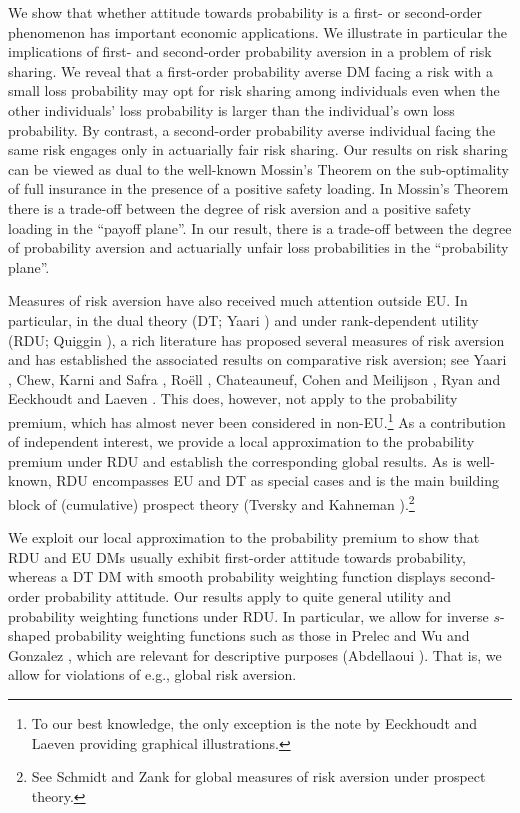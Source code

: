 \documentclass[11pt]{article}
\begin{document}
We show that whether attitude towards probability is a first- or second-order phenomenon has 
important economic applications.
We illustrate in particular the 
implications of first- and second-order probability aversion
in a problem of risk sharing.
We reveal that a first-order probability averse DM facing a risk with a small loss probability may opt for 
risk sharing among individuals
even when the other individuals' loss probability is 
larger than the individual's own loss probability.
By contrast, a second-order probability averse individual facing the same risk engages only in actuarially fair 
risk sharing.
Our results on risk sharing can be viewed as dual to the well-known Mossin's \cite{M68} Theorem
on the sub-optimality of full insurance in the presence of a positive safety loading.
In Mossin's Theorem there is a trade-off between the degree of risk aversion
and a positive safety loading in the ``payoff plane''.
In our result, there is a trade-off between the degree of probability aversion
and actuarially unfair loss probabilities
in the ``probability plane''.

Measures of risk aversion have also received much attention outside EU.
In particular, in the dual theory (DT; Yaari \cite{Y87}) and under rank-dependent utility (RDU; Quiggin \cite{Q82}),
a rich literature
has proposed several measures of risk aversion
and has established the associated results on comparative risk aversion;
see Yaari \cite{Y86,Y87}, Chew, Karni and Safra \cite{CKS87}, Ro\"ell \cite{R87}, Chateauneuf, Cohen and Meilijson \cite{CCM04}, Ryan \cite{R06} and Eeckhoudt and Laeven \cite{EL20}.
This does, however, not apply to the probability premium,
which has almost never been considered in non-EU.\footnote{To our best knowledge, the only exception is the note by Eeckhoudt and Laeven \cite{EL15} providing graphical illustrations.}
As a contribution of independent interest, we provide a local approximation to the probability premium under RDU
and establish the corresponding global results.
As is well-known,
RDU encompasses EU and DT as special cases
and is the main building block of (cumulative) prospect theory (Tversky and Kahneman \cite{TK92}).\footnote{See Schmidt and Zank \cite{SZ08} for global measures of risk aversion
under prospect theory.
}

We exploit our local approximation to the probability premium to show that
RDU and EU DMs usually exhibit first-order attitude towards probability, 
whereas a DT DM with smooth probability weighting function displays second-order probability attitude.
Our results apply to quite general utility and probability weighting functions under RDU.
In particular, we allow for inverse $s$-shaped probability weighting functions
such as those in Prelec \cite{P98} and Wu and Gonzalez \cite{WG96},
which are relevant for descriptive purposes (Abdellaoui \cite{A00}).
That is, we allow for violations of e.g., global risk aversion.
\end{document}
